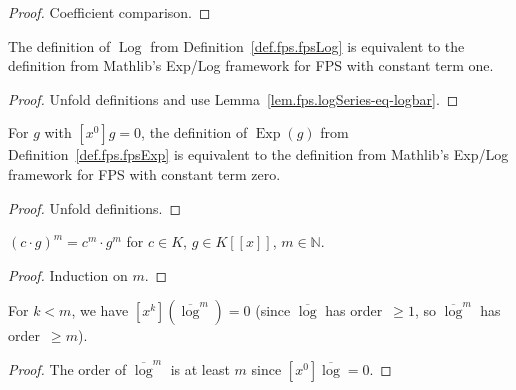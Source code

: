 \begin{proof}
\leanok
Coefficient comparison.
\end{proof}

\begin{lemma}
\label{lem.fps.fpsLog-eq-Log-val}
\leanhelper
\leanok
The definition of $\operatorname{Log}$ from Definition~\ref{def.fps.fpsLog}
is equivalent to the definition from Mathlib's Exp/Log framework for FPS with constant term one.
\end{lemma}

\begin{proof}
\leanok
Unfold definitions and use Lemma~\ref{lem.fps.logSeries-eq-logbar}.
\end{proof}

\begin{lemma}
\label{lem.fps.fpsExp-eq-Exp-val}
\leanhelper
\leanok
For $g$ with $[x^0]g=0$, the definition of $\operatorname{Exp}(g)$ from Definition~\ref{def.fps.fpsExp}
is equivalent to the definition from Mathlib's Exp/Log framework for FPS with constant term zero.
\end{lemma}

\begin{proof}
\leanok
Unfold definitions.
\end{proof}

\begin{lemma}
\label{lem.fps.smul-pow-eq-pow-smul}
\leanhelper
\leanok
$(c\cdot g)^m = c^m\cdot g^m$ for $c\in K$, $g\in K[[x]]$, $m\in\mathbb{N}$.
\end{lemma}

\begin{proof}
\leanok
Induction on $m$.
\end{proof}

\begin{lemma}
\label{lem.fps.coeff-logSeries-pow-eq-zero}
\leanhelper
\leanok
For $k < m$, we have $[x^k](\overline{\log}^m) = 0$
(since $\overline{\log}$ has order~$\geq 1$, so $\overline{\log}^m$
has order~$\geq m$).
\end{lemma}

\begin{proof}
\leanok
The order of $\overline{\log}^m$ is at least $m$ since
$[x^0]\overline{\log}=0$.
\end{proof}

